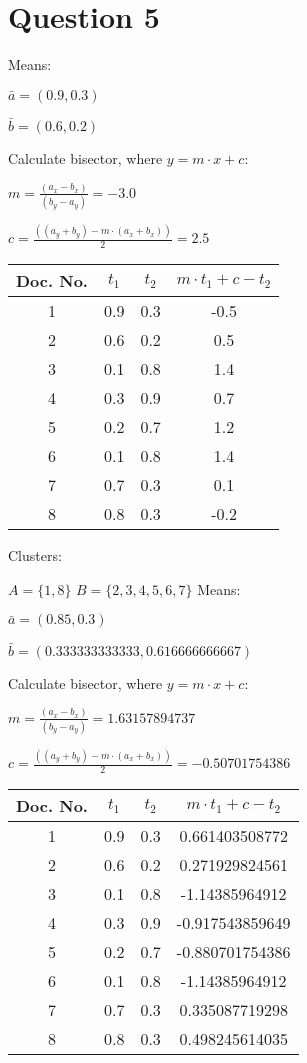 \documentclass[11pt]{article}
\begin{document}
\section*{Question 5}

Means:

$\bar{a} = (0.9, 0.3)$

$\bar{b} = (0.6, 0.2)$

Calculate bisector, where $y = m \cdot x + c$:

$m = \frac{(a_x - b_x)}{(b_y - a_y)} = -3.0$

$c = \frac{((a_y+b_y) - m \cdot (a_x+b_x))}{2} = 2.5$

\begin{tabular}{c | c | c | c}
Doc. No. & $t_1$ & $t_2$ & $m \cdot t_1 + c - t_2$ \\
\hline
1 & 0.9 & 0.3 & -0.5 \\
2 & 0.6 & 0.2 & 0.5 \\
3 & 0.1 & 0.8 & 1.4 \\
4 & 0.3 & 0.9 & 0.7 \\
5 & 0.2 & 0.7 & 1.2 \\
6 & 0.1 & 0.8 & 1.4 \\
7 & 0.7 & 0.3 & 0.1 \\
8 & 0.8 & 0.3 & -0.2 \\
\end{tabular}

Clusters:

$A = \{1,8\}$
$B = \{2,3,4,5,6,7\}$
Means:

$\bar{a} = (0.85, 0.3)$

$\bar{b} = (0.333333333333, 0.616666666667)$

Calculate bisector, where $y = m \cdot x + c$:

$m = \frac{(a_x - b_x)}{(b_y - a_y)} = 1.63157894737$

$c = \frac{((a_y+b_y) - m \cdot (a_x+b_x))}{2} = -0.50701754386$

\begin{tabular}{c | c | c | c}
Doc. No. & $t_1$ & $t_2$ & $m \cdot t_1 + c - t_2$ \\
\hline
1 & 0.9 & 0.3 & 0.661403508772 \\
2 & 0.6 & 0.2 & 0.271929824561 \\
3 & 0.1 & 0.8 & -1.14385964912 \\
4 & 0.3 & 0.9 & -0.917543859649 \\
5 & 0.2 & 0.7 & -0.880701754386 \\
6 & 0.1 & 0.8 & -1.14385964912 \\
7 & 0.7 & 0.3 & 0.335087719298 \\
8 & 0.8 & 0.3 & 0.498245614035 \\
\end{tabular}
\end{document}
